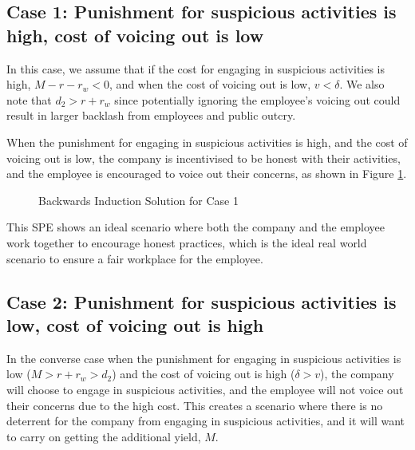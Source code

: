 \documentclass[a4paper, 12pt]{article}
\begin{document}
\subsection{Case 1: Punishment for suspicious activities is high, cost of voicing out is low}

In this case, we assume that if the cost for engaging in suspicious activities is high, $M-r-r_w <0$, and when the cost of voicing out is low, $v < \delta$. We also note that $d_2 > r + r_w$ since potentially ignoring the employee's voicing out could result in larger backlash from employees and public outcry.

When the punishment for engaging in suspicious activities is high, and the cost of voicing out is low, the company is incentivised to be honest with their activities, and the employee is encouraged to voice out their concerns, as shown in Figure \ref{fig:case1}. 

\begin{figure}[H]
\begin{center}
\end{center}
\caption{Backwards Induction Solution for Case 1}
\label{fig:case1}
\end{figure}

This SPE shows an ideal scenario where both the company and the employee work together to encourage honest practices, which is the ideal real world scenario to ensure a fair workplace for the employee. 

\subsection{Case 2: Punishment for suspicious activities is low, cost of voicing out is high}
In the converse case when the punishment for engaging in suspicious activities is low ($M > r + r_w > d_2$) and the cost of voicing out is high ($\delta > v$), the company will choose to engage in suspicious activities, and the employee will not voice out their concerns due to the high cost. This creates a scenario where there is no deterrent for the company from engaging in suspicious activities, and it will want to carry on getting the additional yield, $M$.
\end{document}
